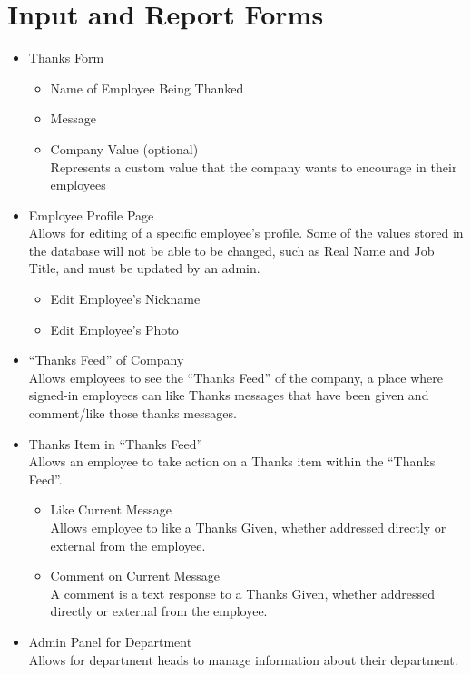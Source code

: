 \documentclass[11pt]{report}
\begin{document}
\section{Input and Report Forms}
\begin{itemize}
    \item Thanks Form
    \begin{itemize}
        \item Name of Employee Being Thanked
        \item Message
        \item Company Value (optional) \\
        Represents a custom value that the company wants to encourage in their employees
    \end{itemize}
    \item Employee Profile Page \\
    Allows for editing of a specific employee's profile. Some of the values stored in the database will not be able to be changed, such as Real Name and Job Title, and must be updated by an admin.
    \begin{itemize}
        \item Edit Employee's Nickname
        \item Edit Employee's Photo
    \end{itemize}
    \item ``Thanks Feed'' of Company \\
    Allows employees to see the ``Thanks Feed'' of the company, a place where signed-in employees can like Thanks messages that have been given and comment/like those thanks messages.
    \item Thanks Item in ``Thanks Feed'' \\
    Allows an employee to take action on a Thanks item within the ``Thanks Feed''.
    \begin{itemize}
        \item Like Current Message \\
        Allows employee to like a Thanks Given, whether addressed directly or external from the employee.
        \item Comment on Current Message \\
        A comment is a text response to a Thanks Given, whether addressed directly or external from the employee.
    \end{itemize}
    \item Admin Panel for Department \\
    Allows for department heads to manage information about their department.

\end{itemize}
\end{document}
